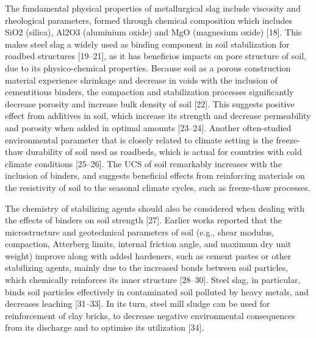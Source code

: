 \documentclass[electronics,article,submit,pdftex,moreauthors]{Definitions/mdpi}
\begin{document}
The fundamental physical properties of metallurgical slag include viscosity and rheological parameters, formed through chemical composition which includes SiO2 (silica), Al2O3 (aluminium oxide) and MgO (magnesium oxide) [18]. This makes steel slag a widely used as binding component in soil stabilization for roadbed structures [19–21], as it has beneficios impacts on pore structure of soil, due to its physico-chemical properties. Because soil as a porous construction material experience shrinkage and decrease in voids with the inclusion of cementitious binders, the compaction and stabilization processes significantly decrease porosity and increase bulk density of soil [22]. This suggests positive effect from additives in soil, which increase its strength and decrease permeability and porosity when added in optimal amounts [23–24]. Another often-studied environmental parameter that is closely related to climate setting is the freeze-thaw durability of soil used as roadbeds, which is actual for countries with cold climate conditions [25–26]. The UCS of soil remarkably increases with the inclusion of binders, and suggests beneficial effects from reinforcing materials on the resistivity of soil to the seasonal climate cycles, such as freeze-thaw processes. 

The chemistry of stabilizing agents should also be considered when dealing with the effects of binders on soil strength [27]. Earlier works reported that the microstructure and geotechnical parameters of soil (e.g., shear modulus, compaction, Atterberg limits, internal friction angle, and maximum dry unit weight) improve along with added hardeners, such as cement pastes or other stabilizing agents, mainly due to the increased bonds between soil particles, which chemically reinforces its inner structure [28–30]. Steel slag, in particular, binds soil particles effectively in contaminated soil polluted by heavy metals, and decreases leaching [31–33]. In its turn, steel mill sludge can be used for reinforcement of clay bricks, to decrease negative environmental consequences from its discharge and to optimise its utilization [34].
\end{document}
